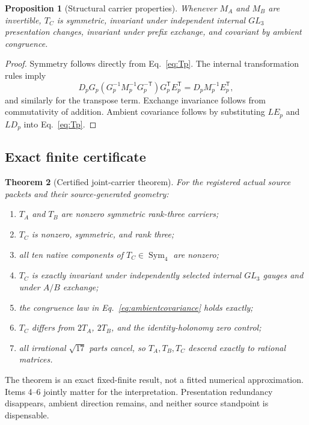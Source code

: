 \documentclass[11pt]{article}
\newtheorem{theorem}{Theorem}[section]
\newtheorem{proposition}[theorem]{Proposition}
\theoremstyle{definition}
\theoremstyle{remark}
\newcommand{\Sym}{\operatorname{Sym}}
\begin{document}
\begin{proposition}[Structural carrier properties]\label{prop:structural}
Whenever $M_A$ and $M_B$ are invertible, $T_C$ is symmetric, invariant under independent internal $GL_3$ presentation changes, invariant under prefix exchange, and covariant by ambient congruence.
\end{proposition}

\begin{proof}
Symmetry follows directly from Eq.~\eqref{eq:Tp}. The internal transformation rules imply
\[
 D_pG_p(G_p^{-1}M_p^{-1}G_p^{-\mathsf T})G_p^{\mathsf T}E_p^{\mathsf T}
 =D_pM_p^{-1}E_p^{\mathsf T},
\]
and similarly for the transpose term. Exchange invariance follows from commutativity of addition. Ambient covariance follows by substituting $LE_p$ and $LD_p$ into Eq.~\eqref{eq:Tp}.
\end{proof}

\subsection{Exact finite certificate}

\begin{theorem}[Certified joint-carrier theorem]\label{thm:x60}
For the registered actual source packets and their source-generated geometry:
\begin{enumerate}
\item $T_A$ and $T_B$ are nonzero symmetric rank-three carriers;
\item $T_C$ is nonzero, symmetric, and rank three;
\item all ten native components of $T_C\in\Sym_4$ are nonzero;
\item $T_C$ is exactly invariant under independently selected internal $GL_3$ gauges and under $A/B$ exchange;
\item the congruence law in Eq.~\eqref{eq:ambientcovariance} holds exactly;
\item $T_C$ differs from $2T_A$, $2T_B$, and the identity-holonomy zero control;
\item all irrational $\sqrt{17}$ parts cancel, so $T_A,T_B,T_C$ descend exactly to rational matrices.
\end{enumerate}
\end{theorem}

The theorem is an exact fixed-finite result, not a fitted numerical approximation. Items 4--6 jointly matter for the interpretation. Presentation redundancy disappears, ambient direction remains, and neither source standpoint is dispensable.
\end{document}

